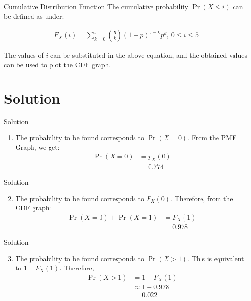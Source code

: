 \documentclass{beamer}
\providecommand{\pr}[1]{\ensuremath{\Pr\left(#1\right)}}
\begin{document}
\begin{frame}{Cumulative Distribution Function}
The cumulative probability $ \pr{X \leq i}$ can be defined as under:

\begin{block}{}
\begin{align}
          \label{eq2}
       F_{X}(i) = \sum_{k=0}^{i} \binom{5}{k} (1-p)^{5-k} p^k ,~ 0 \le i \le 5
\end{align}
\end{block}

The values of $i$ can be substituted in the above equation, and the obtained values can be used to plot the CDF graph.

\end{frame}


\section{Solution}
\begin{frame}{Solution}
\begin{enumerate}[label=(\roman*)]
  \setcounter{enumi}{0}
\item The probability to be found corresponds to $\pr{X=0}$. From the PMF Graph, we get:
\begin{align}
    \pr{X=0} &= p_X(0) \\
             &=0.774 
             \label{eq5}
\end{align}
\end{enumerate}
\end{frame}

\begin{frame}{Solution}
\begin{enumerate}[label=(\roman*)]
  \setcounter{enumi}{1}
\item The probability to be found corresponds to $F_X(0)$. Therefore, from the CDF graph:
\begin{align}
    \pr{X=0}+\pr{X=1} &=F_X(1) \\
             &= 0.978
\end{align}
\end{enumerate}
\end{frame}


\begin{frame}{Solution}
\begin{enumerate}[label=(\roman*)]
  \setcounter{enumi}{2}
\item The probability to be found corresponds to $\pr{X>1}$. This is equivalent to $1-F_X(1)$. Therefore, 
\begin{align}
    \pr{X>1} &= 1-F_X(1) \\
             &\approx 1-0.978 \\
             &= 0.022 
\end{align}

\end{enumerate}
\end{frame}
\end{document}
